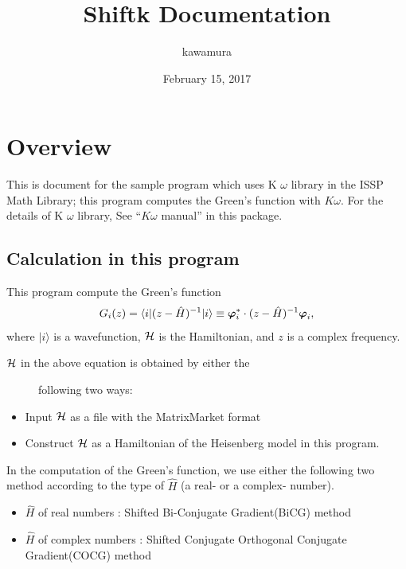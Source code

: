 \documentclass[letterpaper,10pt,dvipdfmx,openany]{sphinxmanual}
\title{Shiftk Documentation}
\date{February 15, 2017}
\author{kawamura}
\begin{document}
\maketitle
\tableofcontents
{}\label{index::doc}



\chapter{Overview}
\label{shiftk_overview_en:overview}\label{shiftk_overview_en:welcome-to-sample-program-s-documentation}\label{shiftk_overview_en::doc}
This is document for the sample program which uses
K \(\omega\) library in the ISSP Math Library;
this program computes the Green's function with \(K\omega\).
For the details of K \(\omega\) library, See
``\(K\omega\) manual'' in this package.


\section{Calculation in this program}
\label{shiftk_overview_en:calculation-in-this-program}
This program compute the Green's function
\begin{gather}
\begin{split}\begin{align}
G_{i}(z) =
\langle i | (z-{\hat H})^{-1}| i \rangle
\equiv
{\boldsymbol \varphi}_i^{*} \cdot (z-{\hat H})^{-1} {\boldsymbol \varphi}_i,
\end{align}\end{split}\notag
\end{gather}
where \(| i \rangle\) is a wavefunction,
\({\cal H}\) is the Hamiltonian, and
\(z\) is a complex frequency.
\begin{description}
\item[{\({\cal H}\) in the above equation is obtained by either the}] \leavevmode
following two ways:

\end{description}
\begin{itemize}
\item {} 
Input \({\cal H}\) as a file with the MatrixMarket format

\item {} 
Construct \({\cal H}\) as a Hamiltonian of the
Heisenberg model in this program.

\end{itemize}

In the computation of the Green's function,
we use either the following two method according to the type
of \({\hat H}\) (a real- or a complex- number).
\begin{itemize}
\item {} 
\({\hat H}\) of real numbers : Shifted Bi-Conjugate Gradient(BiCG) method

\item {} 
\({\hat H}\) of complex numbers : Shifted Conjugate Orthogonal Conjugate Gradient(COCG) method

\end{itemize}
\end{document}
